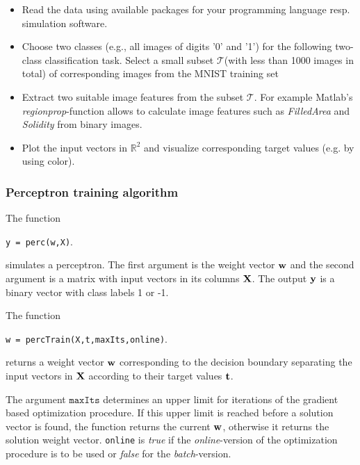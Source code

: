 \documentclass[a4]{article}
\begin{document}
\begin{itemize}
\item Read the data using available packages for your programming language resp. simulation software.
\item Choose two classes (e.g., all images  of digits '0' and '1') for the following two-class classification task. Select a small subset $\mathcal{T}$(with less than 1000 images in total) of corresponding images from the MNIST training set
\item Extract two suitable image features from the subset $\mathcal{T}$. For example Matlab's \emph{regionprop}-function allows to calculate image features such as \emph{FilledArea} and \emph{Solidity} from binary images.
\item Plot the input vectors in $\mathbb{R}^2$ and visualize corresponding target values (e.g. by using color). 
\end{itemize}

\subsubsection{Perceptron training algorithm}
The function
\begin{center}
\texttt{y = perc(w,X)}.
\end{center}
simulates a perceptron. The first argument is the weight vector ${\bf w}$ and the second argument is a matrix with input vectors in its columns ${\bf X}$. The output ${\bf y}$ is a binary vector with class labels 1 or -1.

The function
\begin{center}
\texttt{w = percTrain(X,t,maxIts,online)}.
\end{center} 
returns a weight vector ${\bf w}$ corresponding to the decision boundary separating the input vectors in ${\bf X}$ according to their target values ${\bf t}$.

The argument $\texttt{maxIts}$ determines an upper limit for iterations of the gradient based optimization procedure. If this upper limit is reached before a solution vector is found, the function returns the current ${\bf w}$, otherwise it returns the solution weight vector. \texttt{online} is \emph{true} if the \emph{online}-version of the optimization procedure is to be used or \emph{false} for the \emph{batch}-version. 
\vspace{2mm}
\end{document}
